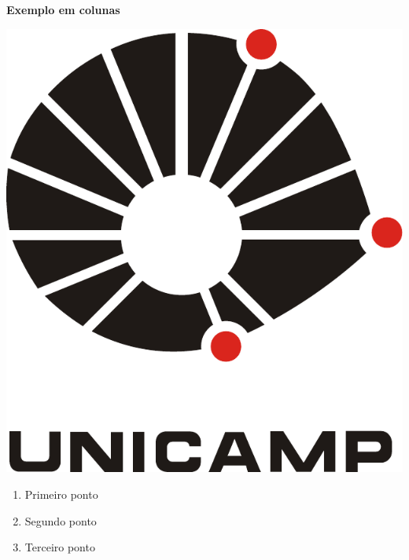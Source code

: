 \documentclass[landscape]{slides}
\newcommand{\stitle}[1]{{\Large\bfseries #1}}
\begin{document}
\begin{slide}
\stitle{Exemplo em colunas}

\begin{minipage}[t][120mm][c]{120mm}

\centering\includegraphics[width=0.8\hsize]{unicamp-logo}

\end{minipage}%
\hfill%
\begin{minipage}[t][120mm][c]{120mm}

\begin{enumerate}
\item Primeiro ponto
\item Segundo ponto
\item Terceiro ponto
\end{enumerate}

\end{minipage}

\end{slide}
\end{document}

